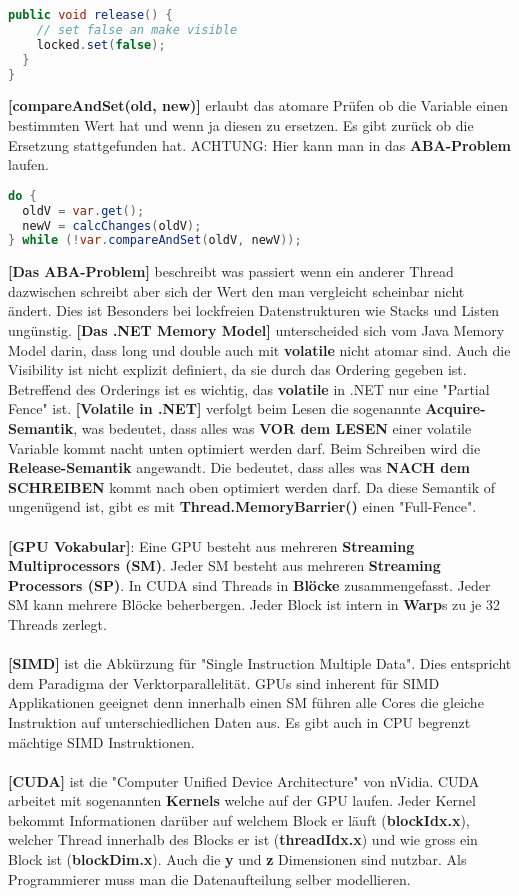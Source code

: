 \documentclass[8pt]{extarticle}
\let\oldtextbf\textbf
\renewcommand{\textbf}{\tiny\oldtextbf}
\begin{document}
\begin{multicols*}{5}
\begin{lstlisting}[language=java]
  public void release() {
    // set false an make visible
    locked.set(false);
  }
}
\end{lstlisting}
\textbf{[compareAndSet(old, new)]} erlaubt das atomare Prüfen ob die Variable einen bestimmten Wert hat und wenn ja diesen zu ersetzen. Es gibt zurück ob die Ersetzung stattgefunden hat. ACHTUNG: Hier kann man in das \textbf{ABA-Problem} laufen.
\begin{lstlisting}[language=java]
do {
  oldV = var.get();
  newV = calcChanges(oldV);
} while (!var.compareAndSet(oldV, newV));
\end{lstlisting}
\textbf{[Das ABA-Problem]} beschreibt was passiert wenn ein anderer Thread dazwischen schreibt aber sich der Wert den man vergleicht scheinbar nicht ändert. Dies ist Besonders bei lockfreien Datenstrukturen wie Stacks und Listen ungünstig.
\textbf{[Das .NET Memory Model]} unterscheided sich vom Java Memory Model darin, dass long und double auch mit \textbf{volatile} nicht atomar sind. Auch die Visibility ist nicht explizit definiert, da sie durch das Ordering gegeben ist. Betreffend des Orderings ist es wichtig, das \textbf{volatile} in .NET nur eine "Partial Fence" ist.
\textbf{[Volatile in .NET]} verfolgt beim Lesen die sogenannte \textbf{Acquire-Semantik}, was bedeutet, dass alles was \textbf{VOR dem LESEN} einer volatile Variable kommt nacht unten optimiert werden darf. Beim Schreiben wird die \textbf{Release-Semantik} angewandt. Die bedeutet, dass alles was \textbf{NACH dem SCHREIBEN} kommt nach oben optimiert werden darf. Da diese Semantik of ungenügend ist, gibt es mit \textbf{Thread.MemoryBarrier()} einen "Full-Fence".\\\\
\textbf{[GPU Vokabular]}: Eine GPU besteht aus mehreren \textbf{Streaming Multiprocessors (SM)}. Jeder SM besteht aus mehreren \textbf{Streaming Processors (SP)}. In CUDA sind Threads in \textbf{Blöcke} zusammengefasst. Jeder SM kann mehrere Blöcke beherbergen. Jeder Block ist intern in \textbf{Warp}s zu je 32 Threads zerlegt.\\\\
\textbf{[SIMD]} ist die Abkürzung für "Single Instruction Multiple Data". Dies entspricht dem Paradigma der Verktorparallelität. GPUs sind inherent für SIMD Applikationen geeignet denn innerhalb einen SM führen alle Cores die gleiche Instruktion auf unterschiedlichen Daten aus. Es gibt auch in CPU begrenzt mächtige SIMD Instruktionen.\\\\
\textbf{[CUDA]} ist die "Computer Unified Device Architecture" von nVidia. CUDA arbeitet mit sogenannten \textbf{Kernels} welche auf der GPU laufen. Jeder Kernel bekommt Informationen darüber auf welchem Block er läuft (\textbf{blockIdx.x}), welcher Thread innerhalb des Blocks er ist (\textbf{threadIdx.x}) und wie gross ein Block ist (\textbf{blockDim.x}). Auch die \textbf{y} und \textbf{z} Dimensionen sind nutzbar. Als Programmierer muss man die Datenaufteilung selber modellieren.

\end{multicols*}
\end{document}
